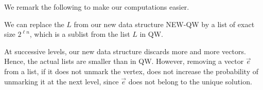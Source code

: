 

We remark the following to make our computations easier.

\begin{fact}
We can replace the $L$ from our new data structure \textsc{NEW-QW} by a list of exact size $2^{\ell n}$, which is a sublist from the list $L$ in \textsc{QW}.
\end{fact}

At successive levels, our new data structure discards more and more vectors. Hence, the actual lists are smaller than in \textsc{QW}. However, removing a vector $\vec{e}$ from a list, if it does not unmark the vertex, does not increase the probability of unmarking it at the next level, since $\vec{e}$ does not belong to the unique solution.

